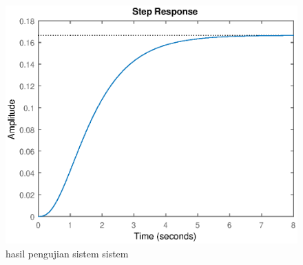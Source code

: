 \documentclass[../main.tex]{subfiles}
\begin{document}
            
            \begin{figure}[H]
                \centering
                \includegraphics{assets/image/Homework_1.eps}
                \caption{hasil pengujian sistem sistem}
                \label{gambar_2}
            \end{figure}
\end{document}
